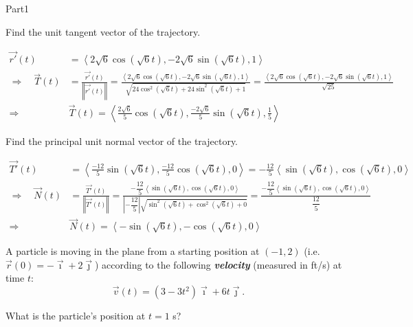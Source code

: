 \documentclass{report}
\newcommand{\norm}[1]{\left\Vert #1 \right\Vert}
\newcommand{\avec}[1]{\left\langle #1 \right\rangle}
\newcommand{\vect}[1]{\overrightarrow{#1}}
\newcommand{\abs}[1]{\left\vert{#1}\right\vert}
\begin{document}
\begin{exam}{Part1}
\begin{problem*}[\auto]
\begin{parts}
\begin{workarea}{3in}
\end{workarea}
\item{}Find the unit tangent vector of the trajectory.
\begin{solution}[2in] 
\begin{align*}
\vect{r'}(t)&=\avec{2\sqrt{6}\cos(\sqrt{6}t),-2\sqrt{6}\sin(\sqrt{6}t),1} \\
\Longrightarrow\quad \vect{T}(t)&=\frac{\vect{r'}(t)}{\norm{\vect{r'}(t)}}=\frac{\avec{2\sqrt{6}\cos(\sqrt{6}t),-2\sqrt{6}\sin(\sqrt{6}t),1}}{\sqrt{24\cos^2(\sqrt{6}t)+24\sin^2(\sqrt{6}t)+1}}=\frac{\avec{2\sqrt{6}\cos(\sqrt{6}t),-2\sqrt{6}\sin(\sqrt{6}t),1}}{\sqrt{25}}\\
\Longrightarrow\quad&\boxed{\vect{T}(t)=\avec{\frac{2\sqrt{6}}{5}\cos(\sqrt{6}t),\frac{-2\sqrt{6}}{5}\sin(\sqrt{6}t),\frac{1}{5}}}
\end{align*}
\end{solution}
\item{}Find the principal unit normal vector of the trajectory.  
\begin{solution}[2in]
\begin{align*}
\vect{T'}(t)&=\avec{\frac{-12}{5}\sin(\sqrt{6}t),\frac{-12}{5}\cos(\sqrt{6}t),0}=-\frac{12}{5}\avec{\sin(\sqrt{6}t),\cos(\sqrt{6}t),0} \\
\Longrightarrow\quad \vect{N}(t)&=\frac{\vect{T'}(t)}{\norm{\vect{T'}(t)}}=\frac{-\dfrac{12}{5}\avec{\sin(\sqrt{6}t),\cos(\sqrt{6}t),0}}{\abs{-\dfrac{12}{5}}\sqrt{\sin^2(\sqrt{6}t)+\cos^2(\sqrt{6}t)+0}}=\frac{-\dfrac{12}{5}\avec{\sin(\sqrt{6}t),\cos(\sqrt{6}t),0}}{\dfrac{12}{5}}\\
\Longrightarrow\quad&\boxed{\vect{N}(t)=\avec{-\sin(\sqrt{6}t),-\cos(\sqrt{6}t),0}}
\end{align*}
\end{solution}
\end{parts}
\end{problem*}
\begin{problem*}[\auto] A particle is moving in the plane from a starting position at $(-1,2)$ (i.e. $\vect{r}(0)=-\vect{\imath}+2\vect{\jmath}$) according to the following  \textbf{\emph{velocity}} (measured in ft/s) at time $t$:
$$\vect{v}(t)=(3-3t^2)\vect{\imath}+6t\vect{\jmath}. $$
\begin{parts}
\item{} What is the particle's position at $t=1$ s?

\end{parts}
\end{problem*}
\end{exam}
\end{document}
